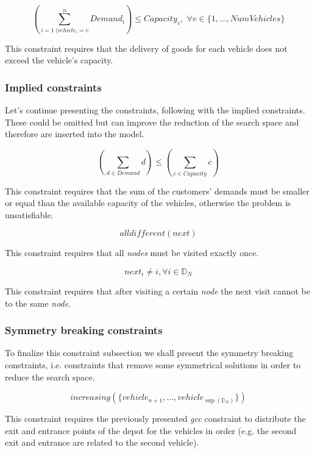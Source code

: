 \documentclass[../main.tex]{subfiles}
\begin{document}
\begin{center}
    \begin{equation}
        (\sum_{i = 1 \; | vehicle_i = v}^n{Demand_i}) \leq Capacity_v ,\; \forall v \in \{1,\dots,NumVehicles\}
    \end{equation}
\end{center}
This constraint requires that the delivery of goods for each vehicle does not exceed the vehicle's capacity.

\subsubsection{Implied constraints}
\label{subsubsec:implied-constraints}
Let's continue presenting the constraints, following with the implied constraints. These could be omitted but can improve the reduction of the search space and therefore are inserted into the model.\\
\begin{center}
    \begin{equation}
        (\sum_{d \in Demand}{d}) \leq (\sum_{c \in Capacity}{c})
    \end{equation}
\end{center}
This constraint requires that the sum of the customers' demands must be smaller or equal than the available capacity of the vehicles, otherwise the problem is unsatisfiable.

\begin{center}
    \begin{equation}
        alldifferent(next)
    \end{equation}
\end{center}
This constraint requires that all \textit{nodes} must be visited exactly once.

\begin{center}
    \begin{equation}
        next_i \neq i, \forall i \in \mathbb{D}_N
    \end{equation}
\end{center}
This constraint requires that after visiting a certain \textit{node} the next visit cannot be to the same \textit{node}.

\subsubsection{Symmetry breaking constraints}
\label{subsubsec:symmetry-breaking-constraints}
To finalize this constraint subsection we shall present the symmetry breaking constraints, i.e. constraints that remove some symmetrical solutions in order to reduce the search space.
\begin{center}
    \begin{equation}
        increasing(\{vehicle_{n+1},\dots,vehicle_{\sup{}(\mathbb{D}_N)}\})
    \end{equation}
\end{center}
This constraint requires the previously presented \textit{gcc} constraint to distribute the exit and entrance points of the depot for the vehicles in order (e.g. the second exit and entrance are related to the second vehicle).
\end{document}
